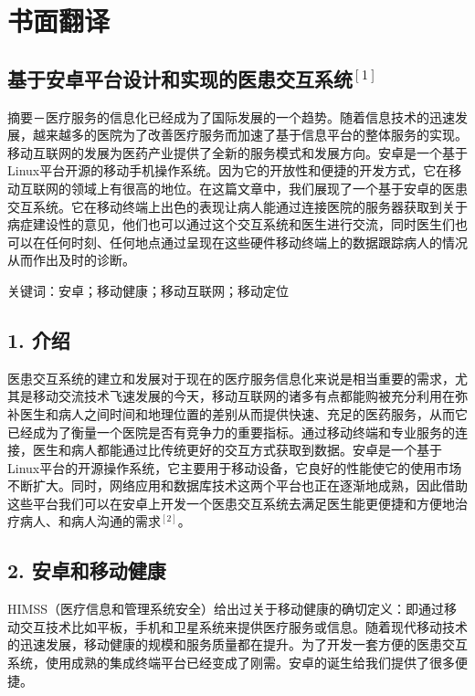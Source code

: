
\chapter{书面翻译}
\begin{center}
\section*{基于安卓平台设计和实现的医患交互系统$^{[1]}$}
\end{center}

摘要－医疗服务的信息化已经成为了国际发展的一个趋势。随着信息技术的迅速发展，越来越多的医院为了改善医疗服务而加速了基于信息平台的整体服务的实现。移动互联网的发展为医药产业提供了全新的服务模式和发展方向。安卓是一个基于Linux平台开源的移动手机操作系统。因为它的开放性和便捷的开发方式，它在移动互联网的领域上有很高的地位。在这篇文章中，我们展现了一个基于安卓的医患交互系统。它在移动终端上出色的表现让病人能通过连接医院的服务器获取到关于病症建设性的意见，他们也可以通过这个交互系统和医生进行交流，同时医生们也可以在任何时刻、任何地点通过呈现在这些硬件移动终端上的数据跟踪病人的情况从而作出及时的诊断。

关键词：安卓；移动健康；移动互联网；移动定位


\section*{1. 介绍}

医患交互系统的建立和发展对于现在的医疗服务信息化来说是相当重要的需求，尤其是移动交流技术飞速发展的今天，移动互联网的诸多有点都能购被充分利用在弥补医生和病人之间时间和地理位置的差别从而提供快速、充足的医药服务，从而它已经成为了衡量一个医院是否有竞争力的重要指标。通过移动终端和专业服务的连接，医生和病人都能通过比传统更好的交互方式获取到数据。安卓是一个基于Linux平台的开源操作系统，它主要用于移动设备，它良好的性能使它的使用市场不断扩大。同时，网络应用和数据库技术这两个平台也正在逐渐地成熟，因此借助这些平台我们可以在安卓上开发一个医患交互系统去满足医生能更便捷和方便地治疗病人、和病人沟通的需求$^{[2]}$。

\section*{2. 安卓和移动健康}

HIMSS（医疗信息和管理系统安全）给出过关于移动健康的确切定义：即通过移动交互技术比如平板，手机和卫星系统来提供医疗服务或信息。随着现代移动技术的迅速发展，移动健康的规模和服务质量都在提升。为了开发一套方便的医患交互系统，使用成熟的集成终端平台已经变成了刚需。安卓的诞生给我们提供了很多便捷。

